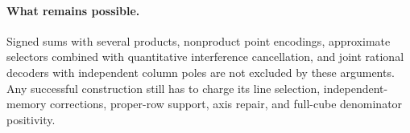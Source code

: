 \documentclass{article}
\begin{document}
\paragraph{What remains possible.}
Signed sums with several products, nonproduct point encodings, approximate
selectors combined with quantitative interference cancellation, and
joint rational decoders with independent column poles are not excluded
by these arguments.  Any successful construction still has to charge
its line selection, independent-memory corrections, proper-row support,
axis repair, and full-cube denominator positivity.
\end{document}
